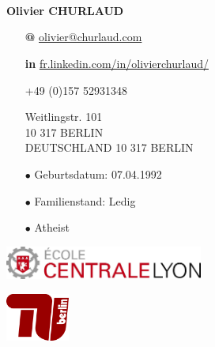 \documentclass[skip,a4paper]{article}
\begin{document}
\fontsize{8.5}{9.5}
\selectfont

\begin{minipage}[c]{\linewidth}
	\begin{minipage}[c][4cm]{2.6cm}
		~\\~\\
		\vfill
		~
	\end{minipage}
	\begin{minipage}[c][4cm]{5.5cm}
		\textbf{Olivier CHURLAUD}

		\begin{itemize}[itemsep=0.5ex,leftmargin=3ex]
			\footnotesize
			\item[\bfseries @] \url{olivier@churlaud.com}
			\item[\bfseries \color{blue} in] {\scriptsize\url{ fr.linkedin.com/in/olivierchurlaud/}}
			\item[\Telefon]+49 (0)157 52931348
			\item[\Letter] Weitlingstr. 101 \\
			10 317 BERLIN \\ 
			DEUTSCHLAND
			10 317 BERLIN
			\item[$\bullet$] Geburtsdatum: 07.04.1992
			\itemsep -2pt
			\item[$\bullet$] Familienstand: Ledig
			\item[$\bullet$] Atheist
		\end{itemize}
	\end{minipage}
	\begin{minipage}[c][4cm]{10cm}
		\begin{minipage}[c]{7.10cm}
			\includegraphics[width=6.5cm]{img/ecl}
		\end{minipage}
		\hfill
		\begin{minipage}[c]{2.5cm}
			\includegraphics[width=2.1cm]{img/tuberlin}
		\end{minipage}
		

\end{minipage}
\end{minipage}
\end{document}
